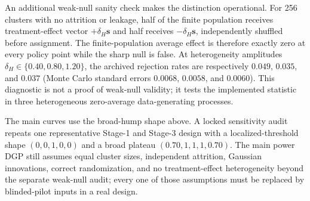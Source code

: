 \documentclass[pdflatex,sn-mathphys-num]{sn-jnl}
\begin{document}
\begin{appendices}
An additional weak-null sanity check makes the distinction operational. For 256 clusters with no attrition or leakage, half of the finite population receives treatment-effect vector $+\delta_H\bm s$ and half receives $-\delta_H\bm s$, independently shuffled before assignment. The finite-population average effect is therefore exactly zero at every policy point while the sharp null is false. At heterogeneity amplitudes $\delta_H\in\{0.40,0.80,1.20\}$, the archived rejection rates are respectively $0.049$, $0.035$, and $0.037$ (Monte Carlo standard errors $0.0068$, $0.0058$, and $0.0060$). This diagnostic is not a proof of weak-null validity; it tests the implemented statistic in three heterogeneous zero-average data-generating processes.

The main curves use the broad-hump shape above. A locked sensitivity audit repeats one representative Stage-1 and Stage-3 design with a localized-threshold shape $(0,0,1,0,0)$ and a broad plateau $(0.70,1,1,1,0.70)$. The main power DGP still assumes equal cluster sizes, independent attrition, Gaussian innovations, correct randomization, and no treatment-effect heterogeneity beyond the separate weak-null audit; every one of those assumptions must be replaced by blinded-pilot inputs in a real design.

\end{appendices}


\end{document}
